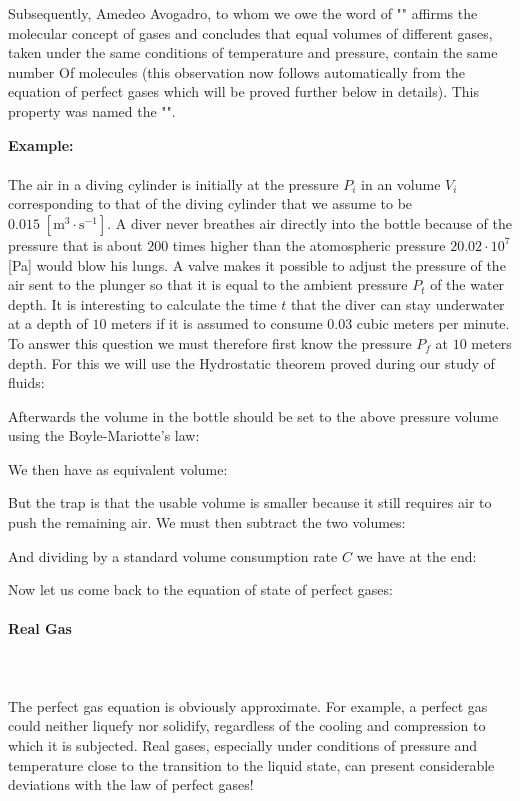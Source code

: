 	Subsequently, Amedeo Avogadro, to whom we owe the word of "" affirms the molecular concept of gases and concludes that equal volumes of different gases, taken under the same conditions of temperature and pressure, contain the same number Of molecules (this observation now follows automatically from the equation of perfect gases which will be proved further below in details). This property was named the "".
	\begin{tcolorbox}[colframe=black,colback=white,sharp corners]
	\textbf{{\Large {}}Example:}\\\\
	The air in a diving cylinder is initially at the pressure $P_i$ in an volume $V_i$ corresponding to that of the diving cylinder that we assume to be $0.015\;[\text{m}^3\cdot \text{s}^{-1}]$. A diver never breathes air directly into the bottle because of the pressure that is about $200$ times higher than the atomospheric pressure $20.02\cdot 10^7$ [Pa] would blow his lungs. A valve makes it possible to adjust the pressure of the air sent to the plunger so that it is equal to the ambient pressure $P_t$ of the water depth. It is interesting to calculate the time $t$ that the diver can stay underwater at a depth of $10$ meters if it is assumed to consume $0.03$ cubic meters per minute.\\
	
	To answer this question we must therefore first know the pressure $P_f$ at $10$ meters depth. For this we will use the Hydrostatic theorem proved during our study of fluids:
	
	Afterwards the volume in the bottle should be set to the above pressure volume using the Boyle-Mariotte's law:
	
	We then have as equivalent volume:
	
	But the trap is that the usable volume is smaller because it still requires air to push the remaining air. We must then subtract the two volumes:
	
	And dividing by a standard volume consumption rate $C$ we have at the end:
	
	\end{tcolorbox}
	Now let us come back to the equation of state of perfect gases:
	

	\pagebreak
	\paragraph{Real Gas}\mbox{}\\\\
	The perfect gas equation is obviously approximate. For example, a perfect gas could neither liquefy nor solidify, regardless of the cooling and compression to which it is subjected. Real gases, especially under conditions of pressure and temperature close to the transition to the liquid state, can present considerable deviations with the law of perfect gases!

